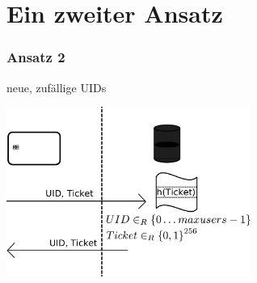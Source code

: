 \section{Ein zweiter Ansatz}

\begin{frame}
	\frametitle{Ansatz 2}
	neue, zufällige UIDs
	\begin{center}
		\includegraphics[width=8cm]{ansatz2ablauf.png}
	\end{center}
\end{frame}



